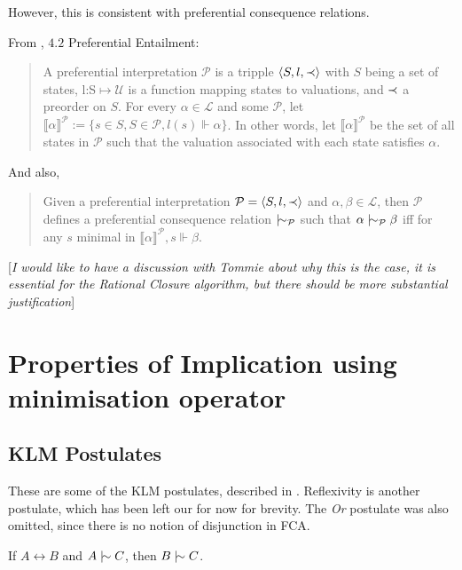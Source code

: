 \documentclass[11pt]{article}
\begin{document}
However, this is consistent with preferential consequence relations.

From \cite{kaliski2020overview}, $4.2$ Preferential Entailment:
\begin{quotation}
  A preferential interpretation $\mathcal{P}$ is a tripple $\langle S, l, \prec \rangle$ with $S$ being a set of states, l:S$\mapsto \mathcal{U}$ is a function mapping states to valuations, and $\prec$ a preorder on $S$. For every $\alpha \in \mathcal{L}$ and some $\mathcal{P}$, let $\llbracket \alpha \rrbracket^{\mathcal{P}}:= \{s\in S, S\in \mathcal{P}, l(s) \Vdash \alpha\}$. In other words, let $\llbracket \alpha \rrbracket^{\mathcal{P}}$ be the set of all states in $\mathcal{P}$ such that the valuation associated with each state satisfies $\alpha$.
\end{quotation}

And also,
\begin{quotation}
  Given a preferential interpretation $\mathcal{P} = \langle S, l, \prec \rangle$ and $\alpha, \beta \in \mathcal{L}$, then $\mathcal{P}$ defines a preferential consequence relation $\twiddle_{\mathcal{P}}$ such that $\alpha \twiddle_{\mathcal{P}} \beta$ iff for any $s$ minimal in $\llbracket \alpha \rrbracket^{\mathcal{P}}, s \Vdash \beta$.
\end{quotation}

[\textit{I would like to have a discussion with Tommie about why this is the case, it is essential for the Rational Closure algorithm, but there should be more substantial justification}]

\section{Properties of Implication using minimisation operator}
\subsection{KLM Postulates}

These are some of the KLM postulates, described in \cite{kaliski2020overview}. Reflexivity is another postulate, which has been left our for now for brevity. The \textit{Or} postulate was also omitted, since there is no notion of disjunction in FCA.

\begin{theorem}
  If $A \leftrightarrow B$ and $A \twiddle C$, then $B \twiddle C$.
\end{theorem}
\end{document}
